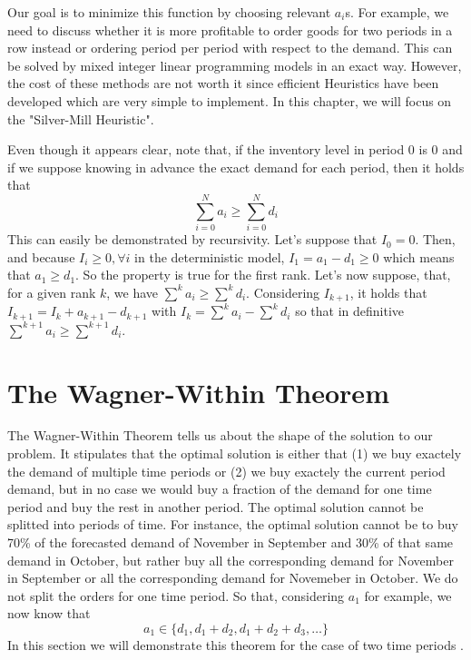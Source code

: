 Our goal is to minimize this function by choosing relevant $a_i$s. For example, we need to discuss whether it is more profitable to order goods for two periods in a row instead or ordering period per period with respect to the demand. This can be solved by mixed integer linear programming models in an exact way. However, the cost of these methods are not worth it since efficient Heuristics have been developed which are very simple to implement. In this chapter, we will focus on the "Silver-Mill Heuristic". 

Even though it appears clear, note that, if the inventory level in period $0$ is $0$ and if we suppose knowing in advance the exact demand for each period, then it holds that \[ \sum_{i=0}^N a_i \ge \sum_{i=0}^Nd_i \]This can easily be demonstrated by recursivity. Let's suppose that $I_0=0$. Then, and because $I_i\ge 0, \forall i$ in the deterministic model, $I_1=a_1-d_1\ge 0$ which means that $a_1\ge d_1$. So the property is true for the first rank. Let's now suppose, that, for a given rank $k$, we have $\sum^k a_i\ge \sum^k d_i$. Considering $I_{k+1}$, it holds that $I_{k+1} = I_k + a_{k+1} - d_{k+1}$ with $I_k = \sum^k a_i - \sum^k d_i$ so that in definitive $\sum^{k+1}a_i\ge\sum^{k+1}d_i$.

\section{The Wagner-Within Theorem}

The Wagner-Within Theorem tells us about the shape of the solution to our problem. It stipulates that the optimal solution is either that (1) we buy exactely the demand of multiple time periods or (2) we buy exactely the current period demand, but in no case we would buy a fraction of the demand for one time period and buy the rest in another period. The optimal solution cannot be splitted into periods of time. For instance, the optimal solution cannot be to buy 70\% of the forecasted demand of November in September and 30\% of that same demand in October, but rather buy all the corresponding demand for November in September or all the corresponding demand for Novemeber in October. We do not split the orders for one time period. So that, considering $a_1$ for example, we now know that \[ a_1 \in \{ d_1, d_1+d_2, d_1+d_2+d_3, \hdots \} \] In this section we will demonstrate this theorem for the case of two time periods \WLOG. 

